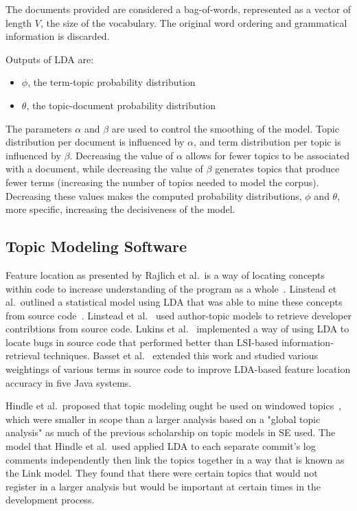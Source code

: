 The documents provided are considered a bag-of-words,
represented as a vector of length $V\!$, the size of the vocabulary.
The original word ordering and grammatical information is discarded.

Outputs of LDA are:
\begin{itemize}
\setlength{\itemsep}{1pt}
\item $\phi$, the term-topic probability distribution
\item $\theta$, the topic-document probability distribution
\end{itemize}

The parameters $\alpha$ and $\beta$ are used to control the smoothing of the model.
Topic distribution per document is influenced by $\alpha$,
and term distribution per topic is influenced by $\beta$.
Decreasing the value of $\alpha$ allows for fewer topics to be associated with a document,
while decreasing the value of $\beta$ generates topics that produce fewer terms
(increasing the number of topics needed to model the corpus).
Decreasing these values makes the computed probability distributions, $\phi$ and $\theta$,
more specific, increasing the decisiveness of the model.

\subsection{Topic Modeling Software}

Feature location as presented by Rajlich et al.\ is a way of locating concepts within code to increase understanding of the program as a whole~\cite{Rajlich-Wilde:2002}.
Linstead et al.\ outlined a statistical model using LDA that was able to mine these concepts from source code~\cite{Linstead-etal:2007b}.
Linstead et al.~\cite{Linstead-etal:2007} used author-topic models to retrieve
developer contribtions from source code.
Lukins et al.~\cite{Lukins-etal:2008} implemented a way of using LDA to locate bugs in source
code that performed better than LSI-based information-retrieval
techniques.
Basset et al.~\cite{Bassett-Kraft:2013} extended this work
and studied various weightings of various terms in source code
to improve LDA-based feature location accuracy in five Java systems.

Hindle et al.\ proposed that topic modeling ought be used on windowed topics~\cite{Hindle-etal:2009}, which were smaller in scope than a larger analysis based on a "global topic analysis" as much of the previous scholarship on topic models in SE used.
The model that Hindle et al.\ used applied LDA to each separate commit's log comments independently then link the topics together in a way that is known as the Link model.
They found that there were certain topics that would not register in a larger analysis but would be important at certain times in the development process.

